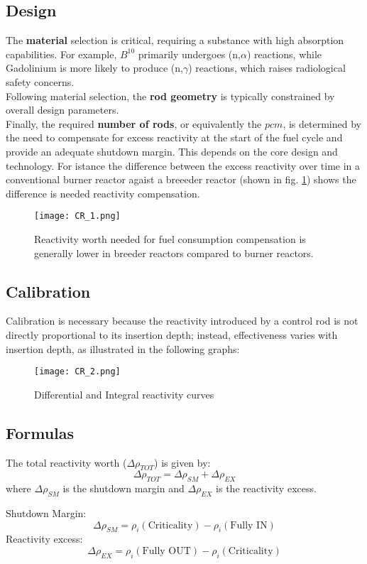 \subsection{Design}
The \textbf{material} selection is critical, requiring a substance with high absorption capabilities. For example, $B^{10}$ primarily undergoes (n,$\alpha$) reactions, while Gadolinium is more likely to produce (n,$\gamma$) reactions, which raises radiological safety concerns. \\
Following material selection, the \textbf{rod geometry} is typically constrained by overall design parameters. \\
Finally, the required \textbf{number of rods}, or equivalently the $pcm$, is determined by the need to compensate for excess reactivity at the start of the fuel cycle and provide an adequate shutdown margin. This depends on the core design and technology. 
For istance the difference between the excess reactivity over time in a conventional burner reactor agaist a breeeder reactor (shown in fig. \ref{fig:excess_reactivity_burner_vs_breeder}) shows the difference is needed reactivity compensation.

\begin{figure}[h]
    \centering
    \texttt{[image: CR\_1.png]}
    \caption{Reactivity worth needed for fuel consumption compensation is generally lower in breeder reactors compared to burner reactors.}
    \label{fig:excess_reactivity_burner_vs_breeder}
\end{figure}

\subsection{Calibration}
Calibration is necessary because the reactivity introduced by a control rod is not directly proportional to its insertion depth; instead, effectiveness varies with insertion depth, as illustrated in the following graphs:

\begin{figure}[h]
    \centering
    \texttt{[image: CR\_2.png]}
    \caption{Differential and Integral reactivity curves}
\end{figure}


\subsection{Formulas}
The total reactivity worth ($\Delta \rho _{TOT}$) is given by:
\begin{equation}
    \Delta \rho _{TOT} = \Delta \rho _{SM} + \Delta \rho _{EX}
\end{equation}
where $\Delta \rho _{SM}$ is the shutdown margin and $\Delta \rho _{EX}$ is the reactivity excess.

Shutdown Margin:
\begin{equation}
    \Delta \rho _{SM} = \rho_i (\text{Criticality}) - \rho_i (\text{Fully IN}) 
\end{equation}
Reactivity excess:
\begin{equation}
    \Delta \rho _{EX} = \rho_i (\text{Fully OUT}) - \rho_i (\text{Criticality})
\end{equation}

